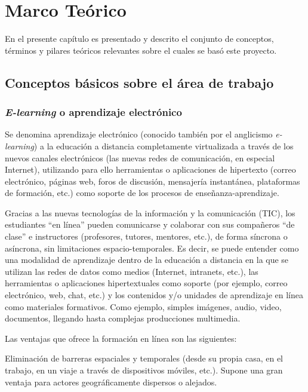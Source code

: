 \chapter{Marco Teórico}
\thispagestyle{empty} %

En el presente capítulo es presentado y descrito el conjunto de conceptos, términos y pilares teóricos relevantes sobre el cuales se basó este proyecto.

\section{Conceptos básicos sobre el área de trabajo}

\subsection{\emph{E-learning} o aprendizaje electrónico}

Se denomina aprendizaje electrónico (conocido también por el anglicismo \emph{e-learning}) a la educación a distancia completamente virtualizada a través de los nuevos canales electrónicos (las nuevas redes de comunicación, en especial Internet), utilizando para ello herramientas o aplicaciones de hipertexto (correo electrónico, páginas web, foros de discusión, mensajería instantánea, plataformas de formación, etc.) como soporte de los procesos de enseñanza-aprendizaje.

Gracias a las nuevas tecnologías de la información y la comunicación (TIC), los estudiantes ``en línea'' pueden comunicarse y colaborar con sus compañeros ``de clase'' e instructores (profesores, tutores, mentores, etc.), de forma síncrona o asíncrona, sin limitaciones espacio-temporales. Es decir, se puede entender como una modalidad de aprendizaje dentro de la educación a distancia en la que se utilizan las redes de datos como medios (Internet, intranets, etc.), las herramientas o aplicaciones hipertextuales como soporte (por ejemplo, correo electrónico, web, chat, etc.) y los contenidos y/o unidades de aprendizaje en línea como materiales formativos. Como ejemplo, simples imágenes, audio, video, documentos, llegando hasta complejas producciones multimedia.

Las ventajas que ofrece la formación en línea son las siguientes:

Eliminación de barreras espaciales y temporales (desde su propia casa, en el trabajo, en un viaje a través de dispositivos móviles, etc.). Supone una gran ventaja para actores geográficamente dispersos o alejados.

